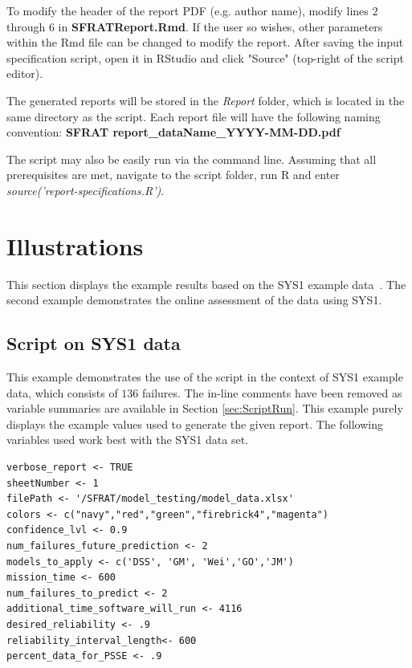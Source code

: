 \documentclass[conference]{IEEEtran}
\begin{document}
To modify the header of the report PDF (e.g. author name), modify lines $2$ through $6$ in \textbf{SFRATReport.Rmd}. If the user so wishes, other parameters within the Rmd file can be changed to modify the report. After saving the input specification script, open it in RStudio and click "Source" (top-right of the script editor).

The generated reports will be stored in the \textit{Report} folder, which is located in the same directory as the script. Each report file will have the following naming convention: 
  \newline
  \textbf{SFRAT report\_dataName\_YYYY-MM-DD.pdf}
  
The script may also be easily run via the command line. Assuming that all prerequisites are met, navigate to the script folder, run R and enter \textit{source('report-specifications.R')}.

\section{Illustrations}\label{sec:Ex}
This section displays the example results based on the SYS1 example data~\cite{BookHoSRE}. The second example demonstrates the online assessment of the data using SYS1.

\subsection{Script on SYS1 data}\label{sec:Ex:Script}
This example demonstrates the use of the script in the context of SYS1 example data, which consists of $136$ failures. The in-line comments have been removed as variable summaries are available in Section \ref{sec:ScriptRun}. This example purely displays the example values used to generate the given report. The following variables used work best with the SYS1 data set.
\begin{lstlisting}
verbose_report <- TRUE								
sheetNumber <- 1
filePath <- '/SFRAT/model_testing/model_data.xlsx'
colors <- c("navy","red","green","firebrick4","magenta")
confidence_lvl <- 0.9
num_failures_future_prediction <- 2	
models_to_apply <- c('DSS', 'GM', 'Wei','GO','JM')
mission_time <- 600
num_failures_to_predict <- 2
additional_time_software_will_run <- 4116
desired_reliability <- .9
reliability_interval_length<- 600
percent_data_for_PSSE <- .9
	
\end{lstlisting}
\end{document}
